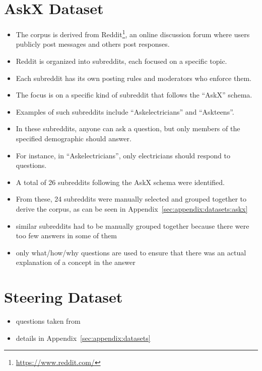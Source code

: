 \section{AskX Dataset}%
\label{sec:datasets:askx}
\begin{itemize}
  \item The corpus is derived from Reddit\footnote{\url{https://www.reddit.com/}}, an online discussion forum where users publicly post messages and others post responses.
  \item Reddit is organized into subreddits, each focused on a specific topic.
  \item Each subreddit has its own posting rules and moderators who enforce them.
  \item The focus is on a specific kind of subreddit that follows the \enquote{AskX} schema.
  \item Examples of such subreddits include \enquote{Askelectricians} and \enquote{Askteens}.
  \item In these subreddits, anyone can ask a question, but only members of the specified demographic should answer.
  \item For instance, in \enquote{Askelectricians}, only electricians should respond to questions.
  \item A total of \num{26} subreddits following the AskX schema were identified.
  \item From these, \num{24} subreddits were manually selected and grouped together to derive the corpus, as can be seen in Appendix~\ref{sec:appendix:datasets:askx}
  \item similar subreddits had to be manually grouped together because there were too few answers in some of them
  \item only what/how/why questions are used to ensure that there was an actual explanation of a concept in the answer
\end{itemize}



\section{Steering Dataset}%
\label{sec:datasets:steering}
\begin{itemize}
  \item questions taken from \citet{petroni-etal-2021-kilt,rooeinKnowYourAudience2023}
  \item details in Appendix~\ref{sec:appendix:datasets}
\end{itemize}
